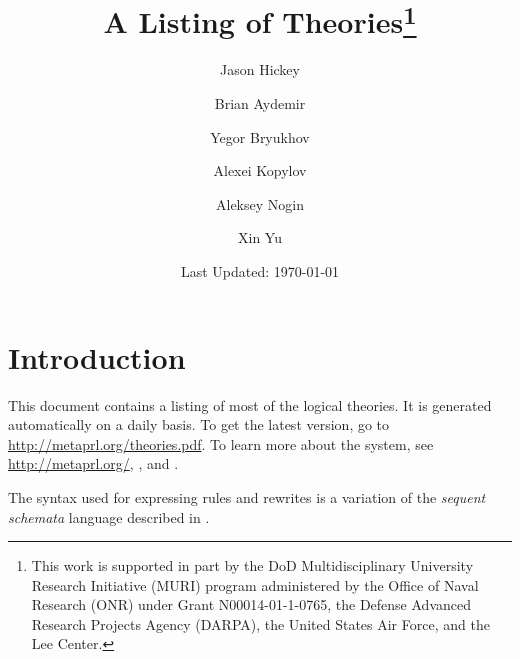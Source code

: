 \documentclass{report}
\begin{document}
\author{Jason Hickey\and Brian Aydemir\and Yegor Bryukhov\and Alexei
Kopylov\and Aleksey Nogin\and Xin Yu}
\title{A Listing of \MetaPRL{} Theories\thanks{This work is supported in part
by the DoD Multidisciplinary University Research Initiative (MURI) program
administered by the Office of Naval Research (ONR) under Grant
N00014-01-1-0765, the Defense Advanced Research Projects Agency (DARPA), the
United States Air Force, and the Lee Center.}}
\date{Last Updated: \today}
\maketitle
\chapter{Introduction}
This document contains a listing of most of the \MetaPRL{}
logical theories. It is generated automatically on a daily basis. To get the
latest version, go to \url{http://metaprl.org/theories.pdf}. To learn more
about the \MetaPRL{} system, see \url{http://metaprl.org/}, \cite{HNC+03},
\cite{Hic01} and \cite{Nog02c}.

The syntax used for expressing \MetaPRL{} rules and rewrites is a variation of the
\emph{sequent schemata} language described in \cite{NH02}.

\sloppy


\printindex



\end{document}
